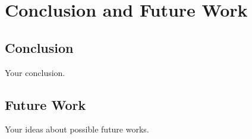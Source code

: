 
\chapter{Conclusion and Future Work}


\section{Conclusion}

Your conclusion.


\section{Future Work}

Your ideas about possible future works.
